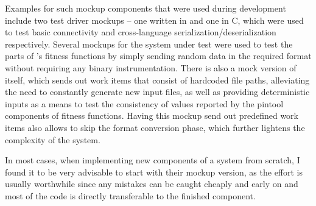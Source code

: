 Examples for such mockup components that were used during development include two test driver mockups -- one
written in \java and one in C, which were used to test basic \zmq connectivity and
cross-language \msgpack serialization/deserialization respectively. Several mockups for the system under test
were used to test the \java parts of \xmlmate's fitness functions by simply sending random data in the
required \msgpack format without requiring any binary instrumentation. There is also a mock version of
\xmlmate itself, which sends out work items that consist of hardcoded file paths, alleviating the need to
constantly generate new input files, as well as providing deterministic inputs as a means to test the
consistency of values reported by the pintool components of fitness functions. Having this mockup send out
predefined work items also allows to skip the format conversion phase, which further lightens the complexity
of the system.

In most cases, when implementing new components of a system from scratch, I found it to be very advisable to
start with their mockup version, as the effort is usually worthwhile since any mistakes can be caught
cheaply and early on and most of the code is directly transferable to the finished component.
\FloatBarrier